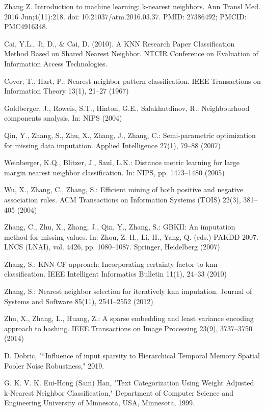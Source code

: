 \documentclass[conference]{IEEEtran}
\begin{document}
\begin{thebibliography}{1}
Zhang Z. Introduction to machine learning: k-nearest neighbors. Ann Transl Med. 2016 Jun;4(11):218. doi: 10.21037/atm.2016.03.37. PMID: 27386492; PMCID: PMC4916348.

Cai, Y.L., Ji, D., & Cai, D. (2010). A KNN Research Paper Classification Method Based on Shared Nearest Neighbor. NTCIR Conference on Evaluation of Information Access Technologies.

Cover, T., Hart, P.: Nearest neighbor pattern classification. IEEE Transactions on Information Theory 13(1), 21–27 (1967)

Goldberger, J., Roweis, S.T., Hinton, G.E., Salakhutdinov, R.: Neighbourhood components analysis. In: NIPS (2004)

Qin, Y., Zhang, S., Zhu, X., Zhang, J., Zhang, C.: Semi-parametric optimization for missing data imputation. Applied Intelligence 27(1), 79–88 (2007)

Weinberger, K.Q., Blitzer, J., Saul, L.K.: Distance metric learning for large margin nearest neighbor classification. In: NIPS, pp. 1473–1480 (2005)

Wu, X., Zhang, C., Zhang, S.: Efficient mining of both positive and negative association rules. ACM Transactions on Information Systems (TOIS) 22(3), 381–405 (2004)

Zhang, C., Zhu, X., Zhang, J., Qin, Y., Zhang, S.: GBKII: An imputation method for missing values. In: Zhou, Z.-H., Li, H., Yang, Q. (eds.) PAKDD 2007. LNCS (LNAI), vol. 4426, pp. 1080–1087. Springer, Heidelberg (2007)

Zhang, S.: KNN-CF approach: Incorporating certainty factor to knn classification. IEEE Intelligent Informatics Bulletin 11(1), 24–33 (2010)

Zhang, S.: Nearest neighbor selection for iteratively knn imputation. Journal of Systems and Software 85(11), 2541–2552 (2012)

Zhu, X., Zhang, L., Huang, Z.: A sparse embedding and least variance encoding approach to hashing. IEEE Transactions on Image Processing 23(9), 3737–3750 (2014)

D. Dobric, "“Influence of input sparsity to Hierarchical Temporal Memory Spatial Pooler Noise Robustness," 2019.

G. K. V. K. Eui-Hong (Sam) Han, "Text Categorization Using Weight Adjusted k-Nearest Neighbor Classification," Department of Computer Science and Engineering University of Minnesota, USA, Minnesota, 1999.


\end{thebibliography}
\end{document}
